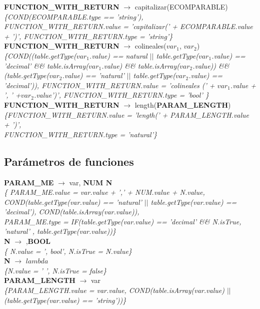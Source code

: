 \documentclass[10pt,a4paper]{article}
\begin{document}
\textbf{FUNCTION\_WITH\_RETURN} $\rightarrow$ capitalizar(ECOMPARABLE)   \\
\textit{\{COND(ECOMPARABLE.type == 'string'), FUNCTION\_WITH\_RETURN.value =  'capitalizar(' + ECOMPARABLE.value + ')', FUNCTION\_WITH\_RETURN.type = 'string'\}} \\

\textbf{FUNCTION\_WITH\_RETURN} $\rightarrow$ colineales($var_{1}$, $var_{2}$)   \\
\textit{\{COND((table.getType($var_{1}$.value) == natural $||$ table.getType($var_{1}$.value) == 'decimal' \&\& table.isArray($var_{1}$.value) \&\& table.isArray($var_{2}$.value)) \&\&
(table.getType($var_{2}$.value) == 'natural' $||$ table.getType($var_{2}$.value) == 'decimal')), FUNCTION\_WITH\_RETURN.value = 'colineales (' + $var_{1}$.value + ', ' +$var_{2}$.value')', FUNCTION\_WITH\_RETURN.type = 'bool' \}} \\

\textbf{FUNCTION\_WITH\_RETURN} $\rightarrow$ length(\textbf{PARAM\_LENGTH}) \\
\textit{\{FUNCTION\_WITH\_RETURN.value =  'length(' + PARAM\_LENGTH.value + ')',\\ 
FUNCTION\_WITH\_RETURN.type = 'natural'\}} \\

\subsection{Parámetros de funciones}
\textbf{PARAM\_ME} $\rightarrow$ var, \textbf{NUM N} \\
\textit{\{ PARAM\_ME.value = var.value + ',' + NUM.value + N.value, COND(table.getType(var.value) == 'natural' $||$ table.getType(var.value) == 'decimal'), COND(table.isArray(var.value)),\\
PARAM\_ME.type = IF(table.getType(var.value) == 'decimal' \&\& N.isTrue,  'natural' , table.getType(var.value))\}} \\

\textbf{N} $\rightarrow$ ,\textbf{BOOL} \\
\textit{\{ N.value = ', bool', N.isTrue = N.value\}} \\ 

\textbf{N} $\rightarrow$ $lambda$  \\
\textit{\{N.value = ' ', N.isTrue = false\}} \\

\textbf{PARAM\_LENGTH} $\rightarrow$ var \\
\textit{\{PARAM\_LENGTH.value = var.value, COND(table.isArray(var.value) $||$ (table.getType(var.value) == 'string'))\}} \\
\end{document}
